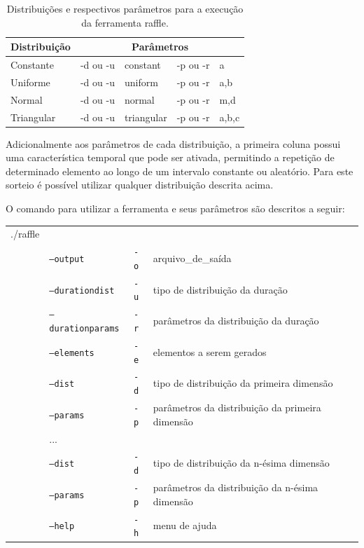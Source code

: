 \begin{table}[!h]
	\centering
	\caption[Distribuições e parâmetros da ferramenta raffle]{Distribuições e respectivos parâmetros para a execução da ferramenta raffle.}
	\label{tab:distparam}
	\begin{tabular}{l|l|l|l|l}
		\hline
		Distribuição & \multicolumn{4}{c}{Parâmetros} \\
		\hline
		Constante  & -d ou -u & constant   & -p ou -r & a \\
		Uniforme   & -d ou -u & uniform	   & -p ou -r & a,b \\
		Normal     & -d ou -u & normal	   & -p ou -r & m,d \\
		Triangular & -d ou -u & triangular & -p ou -r & a,b,c \\
		\hline
	\end{tabular}
\end{table}

Adicionalmente aos parâmetros de cada distribuição, a primeira coluna possui uma característica temporal que pode ser ativada, permitindo a repetição de determinado elemento ao longo de um intervalo constante ou aleatório. Para este sorteio é possível utilizar qualquer distribuição descrita acima.

O comando para utilizar a ferramenta e seus parâmetros são descritos a seguir:

\begin{table}[!h]
	\begin{tabular}{llll}
	./raffle & & \\ 
	& \texttt{--output} & \texttt{-o} & arquivo\_de\_saída \\
	& \texttt{--durationdist} & \texttt{-u}  & tipo de distribuição da duração \\
	& \texttt{--durationparams} & \texttt{-r}  & parâmetros da distribuição da duração \\
	& \texttt{--elements} & \texttt{-e}  & elementos a serem gerados \\
	& \texttt{--dist} & \texttt{-d}  & tipo de distribuição da primeira dimensão \\
	& \texttt{--params} & \texttt{-p}  & parâmetros da distribuição da primeira dimensão \\
	& ... & \\
	& \texttt{--dist} & \texttt{-d}  & tipo de distribuição da n-ésima dimensão \\
	& \texttt{--params} & \texttt{-p}  & parâmetros da distribuição da n-ésima dimensão \\
	& \texttt{--help} & \texttt{-h}  & menu de ajuda \\
	\end{tabular}
\end{table}

